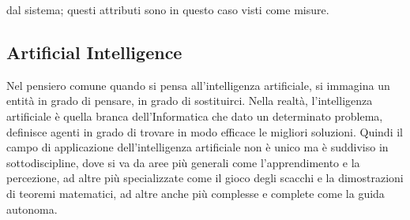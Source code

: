 \documentclass[14pt]{extarticle}
\begin{document}
dal sistema; questi attributi sono in questo caso visti come misure.

\subsection{Artificial Intelligence}
Nel pensiero comune quando si pensa all'intelligenza artificiale, si immagina un entità in grado di pensare, in grado di sostituirci. Nella realtà, l'intelligenza artificiale è quella branca dell'Informatica che dato un determinato problema, definisce  agenti in grado di trovare in modo efficace le migliori soluzioni. Quindi il campo di  applicazione dell'intelligenza artificiale non è unico ma è suddiviso in sottodiscipline, dove si va da aree più generali come l'apprendimento e la percezione, ad altre più specializzate come il gioco degli scacchi e la dimostrazioni di teoremi matematici, ad altre anche più complesse e complete come la guida autonoma.
\end{document}
